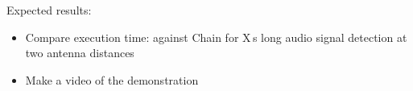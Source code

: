 Expected results:
\begin{itemize}
	\item Compare execution time: \sys against Chain for X\,s long audio signal detection at two antenna distances
	\item Make a video of the demonstration 
\end{itemize}
 
